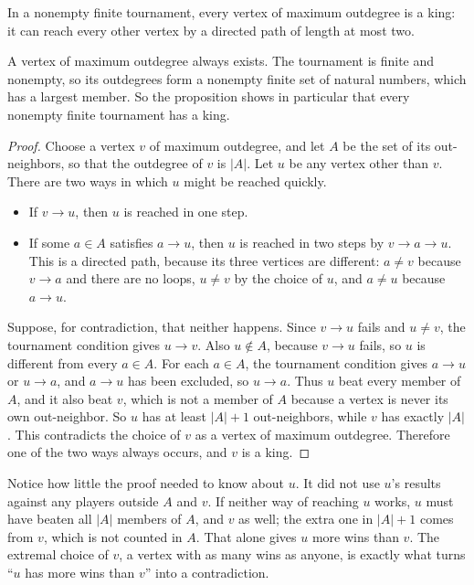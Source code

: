 \par\noindent\begin{minipage}{\linewidth}
\begin{proposition}\label{thm:king}
In a nonempty finite tournament, every vertex of maximum outdegree is a king: it can reach every other vertex by a directed path of length at most two.
\end{proposition}
\end{minipage}\par

A vertex of maximum outdegree always exists. The tournament is finite and nonempty, so its outdegrees form a nonempty finite set of natural numbers, which has a largest member. So the proposition shows in particular that every nonempty finite tournament has a king.

\begin{proof}
Choose a vertex $v$ of maximum outdegree, and let $A$ be the set of its out-neighbors, so that the outdegree of $v$ is $|A|$. Let $u$ be any vertex other than $v$. There are two ways in which $u$ might be reached quickly.
\begin{itemize}
\item If $v\to u$, then $u$ is reached in one step.
\item If some $a\in A$ satisfies $a\to u$, then $u$ is reached in two steps by $v\to a\to u$. This is a directed path, because its three vertices are different: $a\ne v$ because $v\to a$ and there are no loops, $u\ne v$ by the choice of $u$, and $a\ne u$ because $a\to u$.
\end{itemize}
Suppose, for contradiction, that neither happens. Since $v\to u$ fails and $u\ne v$, the tournament condition gives $u\to v$. Also $u\notin A$, because $v\to u$ fails, so $u$ is different from every $a\in A$. For each $a\in A$, the tournament condition gives $a\to u$ or $u\to a$, and $a\to u$ has been excluded, so $u\to a$. Thus $u$ beat every member of $A$, and it also beat $v$, which is not a member of $A$ because a vertex is never its own out-neighbor. So $u$ has at least $|A|+1$ out-neighbors, while $v$ has exactly $|A|$. This contradicts the choice of $v$ as a vertex of maximum outdegree. Therefore one of the two ways always occurs, and $v$ is a king.
\end{proof}

Notice how little the proof needed to know about $u$. It did not use $u$'s results against any players outside $A$ and $v$. If neither way of reaching $u$ works, $u$ must have beaten all $|A|$ members of $A$, and $v$ as well; the extra one in $|A|+1$ comes from $v$, which is not counted in $A$. That alone gives $u$ more wins than $v$. The extremal choice of $v$, a vertex with as many wins as anyone, is exactly what turns ``$u$ has more wins than $v$'' into a contradiction.

